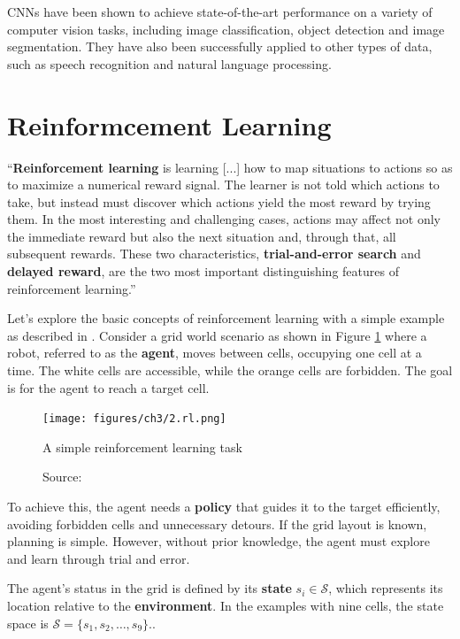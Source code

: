 CNNs have been shown to achieve state-of-the-art performance on
a variety of computer vision tasks, including image classification,
object detection and image segmentation.
They have also been successfully applied to other types of data,
such as speech recognition and natural language processing.

\section{Reinformcement Learning}
\label{sec:rl}

``\textbf{Reinforcement learning} is learning [...] how
to map situations to actions so
as to maximize a numerical reward signal.
The learner is not told which actions to
take, but instead must discover which actions
yield the most reward by trying them. In
the most interesting and challenging cases, actions may
affect not only the immediate
reward but also the next situation and,
through that, all subsequent rewards.
These two
characteristics, \textbf{trial-and-error search} and \textbf{delayed reward},
are the two most important
distinguishing features of reinforcement learning.'' \cite{sutton1998}

Let's explore the basic concepts of reinforcement learning with
a simple example as described in \cite{zhao2024RLBook}.
Consider a grid world scenario as shown in Figure \ref{fig:rl}
where a robot, referred to as
the \textbf{agent}, moves between cells, occupying one cell at a time.
The white cells are accessible, while the orange cells are forbidden.
The goal is for the agent to reach a target cell.

\begin{figure}[h]
    \centering
    \texttt{[image: figures/ch3/2.rl.png]}
    \caption{A simple reinforcement learning task}
    \vspace{-10px}
    \caption*{\scriptsize{Source: \cite{zhao2024RLBook}}}
    \label{fig:rl}
\end{figure}

To achieve this, the agent needs a \textbf{policy} that guides it to the target
efficiently, avoiding forbidden cells and unnecessary detours.
If the grid layout is known, planning is simple.
However, without prior knowledge, the agent must explore and learn
through trial and error.

The agent's status in the grid is defined by its \textbf{state}
\( s_i \in \mathcal{S} \), which represents its location relative
to the \textbf{environment}.
In the examples with nine cells, the state space is
\( \mathcal{S} = \{s_1, s_2, \ldots, s_9\} \)..

